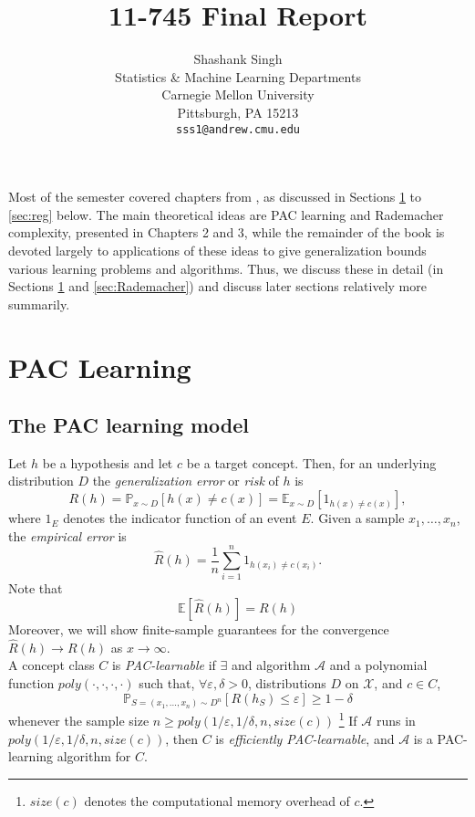 \documentclass{article} %
\title{11-745 Final Report}
\author{
Shashank Singh \\
Statistics \& Machine Learning Departments \\
Carnegie Mellon University \\
Pittsburgh, PA 15213 \\
\texttt{sss1@andrew.cmu.edu}
}
\newcommand{\e}{\varepsilon}                        %
\newcommand{\X}{\mathcal{X}}                        %
\newcommand{\A}{\mathcal{A}}                        %
\newcommand{\E}{\mathbb{E}}                         %
\newcommand{\pr}{\mathbb{P}}                        %
\renewcommand{\hat}{\widehat}
\begin{document}
\maketitle

Most of the semester covered chapters from \citet{mohri12foundations}, as
discussed in Sections \ref{sec:PAC} to \ref{sec:reg} below. The main
theoretical ideas are PAC learning and Rademacher complexity, presented in
Chapters 2 and 3, while the remainder of the book is devoted largely to
applications of these ideas to give generalization bounds various learning
problems and algorithms. Thus, we discuss these in detail (in Sections
\ref{sec:PAC} and \ref{sec:Rademacher}) and discuss later sections relatively
more summarily.

\section{PAC Learning}
\label{sec:PAC}
\subsection{The PAC learning model}
Let $h$ be a hypothesis and let $c$ be a target concept. Then, for an
underlying distribution $D$ the \emph{generalization error} or \emph{risk} of
$h$ is
\[R(h)
    = \pr_{x \sim D}\left[ h(x) \neq c(x) \right]
    = \E_{x \sim D}\left[ 1_{h(x) \neq c(x)} \right],\]
where $1_E$ denotes the indicator function of an event $E$.
Given a sample $x_1,\dots,x_n$, the \emph{empirical error} is
\[\hat R(h) = \frac1n \sum_{i = 1}^n 1_{h(x_i) \neq c(x_i)}.\]
Note that
\begin{equation}
\E[\hat R(h)] = R(h)
\label{eq:exp_emp_risk}
\end{equation}
Moreover, we will show finite-sample guarantees for the convergence
$\hat R(h) \to R(h)$ as $x \to \infty$. \\

A concept class $C$ is \emph{PAC-learnable} if $\exists$ and algorithm $\A$ and
a polynomial function $poly(\cdot,\cdot,\cdot,\cdot)$ such that,
$\forall \e, \delta > 0$, distributions $D$ on $\X$, and $c \in C$,
\[\pr_{S = (x_1,\dots,x_n) \sim D^n}\left[ R(h_S) \leq \e \right]
    \geq 1 - \delta\]
whenever the sample size $n \geq poly(1/\e,1/\delta,n,size(c))$
\footnote{$size(c)$ denotes the computational memory overhead of $c$.}
If $\A$ runs in $poly(1/\e,1/\delta,n,size(c))$, then $C$ is \emph{efficiently
PAC-learnable}, and $\A$ is a PAC-learning algorithm for $C$. \\
\end{document}
